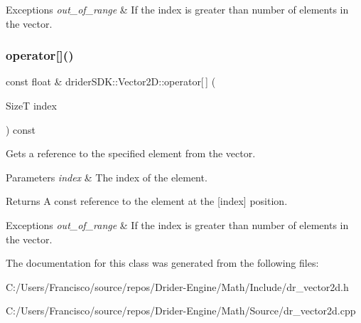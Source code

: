 \begin{DoxyExceptions}{Exceptions}
{\em out\+\_\+of\+\_\+range} & If the index is greater than number of elements in the vector. \\
\hline
\end{DoxyExceptions}
\mbox{\label{classdrider_s_d_k_1_1_vector2_d_a4ac344eb74d7e2ae9a9538cf837272af}} 
\subsubsection{\texorpdfstring{operator[]()}{operator[]()}\hspace{0.1cm}{\footnotesize\ttfamily [2/2]}}
{\footnotesize\ttfamily const float \& drider\+S\+D\+K\+::\+Vector2\+D\+::operator\mbox{[}$\,$\mbox{]} (\begin{DoxyParamCaption}\item[{SizeT}]{index }\end{DoxyParamCaption}) const}

Gets a reference to the specified element from the vector.


\begin{DoxyParams}{Parameters}
{\em index} & The index of the element.\\
\hline
\end{DoxyParams}
\begin{DoxyReturn}{Returns}
A const reference to the element at the \mbox{[}index\mbox{]} position.
\end{DoxyReturn}

\begin{DoxyExceptions}{Exceptions}
{\em out\+\_\+of\+\_\+range} & If the index is greater than number of elements in the vector. \\
\hline
\end{DoxyExceptions}


The documentation for this class was generated from the following files\+:\begin{DoxyCompactItemize}
\item 
C\+:/\+Users/\+Francisco/source/repos/\+Drider-\/\+Engine/\+Math/\+Include/dr\+\_\+vector2d.\+h\item 
C\+:/\+Users/\+Francisco/source/repos/\+Drider-\/\+Engine/\+Math/\+Source/dr\+\_\+vector2d.\+cpp\end{DoxyCompactItemize}
